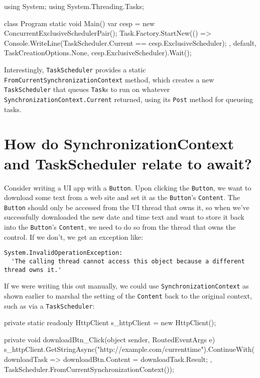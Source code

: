 \documentclass[a4paper,12pt,notitlepage,twoside,openright]{article}
\begin{document}
\begin{csharpcode}
using System;
using System.Threading.Tasks;

class Program
{
    static void Main()
    {
        var cesp = new ConcurrentExclusiveSchedulerPair();
        Task.Factory.StartNew(() =>
        {
            Console.WriteLine(TaskScheduler.Current == cesp.ExclusiveScheduler);
        }, default, TaskCreationOptions.None, cesp.ExclusiveScheduler).Wait();
    }
}
\end{csharpcode}

Interestingly, \texttt{TaskScheduler} provides a static
\texttt{FromCurrentSynchronizationContext} method, which creates a new
\texttt{TaskScheduler} that queues \texttt{Task}s to run on whatever
\texttt{SynchronizationContext.Current} returned, using its
\texttt{Post} method for queueing tasks.

\hypertarget{how-do-synchronizationcontext-and-taskscheduler-relate-to-await}{%
\section{How do SynchronizationContext and TaskScheduler relate to
await?}\label{how-do-synchronizationcontext-and-taskscheduler-relate-to-await}}

Consider writing a UI app with a \texttt{Button}. Upon clicking the
\texttt{Button}, we want to download some text from a web site and set
it as the \texttt{Button}'s \texttt{Content}. The \texttt{Button} should
only be accessed from the UI thread that owns it, so when we've
successfully downloaded the new date and time text and want to store it
back into the \texttt{Button}'s \texttt{Content}, we need to do so from
the thread that owns the control. If we don't, we get an exception like:

\begin{verbatim}
System.InvalidOperationException:
  'The calling thread cannot access this object because a different thread owns it.'
\end{verbatim}

If we were writing this out manually, we could use
\texttt{SynchronizationContext} as shown earlier to marshal the setting
of the \texttt{Content} back to the original context, such as via a
\texttt{TaskScheduler}:

\begin{csharpcode}
private static readonly HttpClient s_httpClient = new HttpClient();

private void downloadBtn_Click(object sender, RoutedEventArgs e)
{
    s_httpClient.GetStringAsync("http://example.com/currenttime").ContinueWith(downloadTask =>
    {
        downloadBtn.Content = downloadTask.Result;
    }, TaskScheduler.FromCurrentSynchronizationContext());
}
\end{csharpcode}
\end{document}

